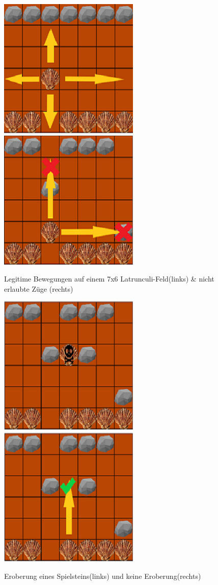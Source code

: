 \begin{figure}[h]
	\centering
	\includegraphics{img/regeln_bewegung222}
	\includegraphics{img/regeln_nottodo22}
	\caption{Legitime Bewegungen auf einem 7x6 Latrunculi-Feld(links) \& nicht erlaubte Züge (rechts)}
	\label{fig:Bewegungen}
\end{figure}
\begin{figure}[h]
	\centering
	\includegraphics{img/regeln_erobern22}
	\includegraphics{img/regeln_nichterobert22}
	\caption{Eroberung eines Spielsteins(links) und keine Eroberung(rechts)}
	\label{fig:erobern}
\end{figure}
